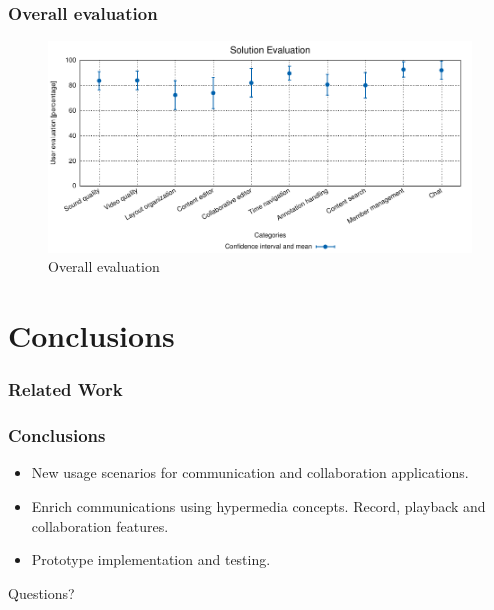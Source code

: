 \documentclass[compress]{beamer}
\begin{document}
	\begin{frame}[c]
		\frametitle{Overall evaluation}
		\begin{figure}[H]
			\includegraphics[width=\textwidth]{figures/user_evals.pdf}
			\caption{Overall evaluation}
		\end{figure}
	\end{frame}

\section{Conclusions}\label{concl} %
\begin{frame}[t,shrink]
\frametitle{Related Work} 
\end{frame}

\begin{frame}[c]
		\frametitle{Conclusions}
		\begin{itemize}
\item New usage scenarios for communication and collaboration applications.
		\vfill

\item Enrich communications using hypermedia concepts. Record, playback and collaboration features.
		\vfill

\item Prototype implementation and testing.
		\end{itemize}

	\end{frame}






\begin{frame}[c]
\Huge{\centerline{Questions?}}
\end{frame}

\end{document}
